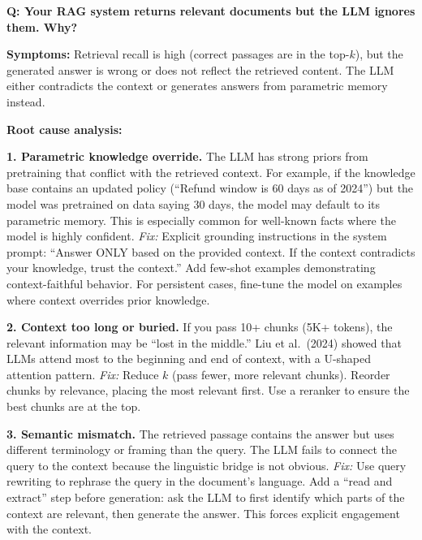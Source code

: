 
\begin{interviewq}
\textbf{Q: Your RAG system returns relevant documents but the LLM ignores them. Why?}

 \quad {} \quad \badgefreq{\freqhigh}

\stronganswer

\textbf{Symptoms:} Retrieval recall is high (correct passages are in the top-$k$), but the generated answer is wrong or does not reflect the retrieved content. The LLM either contradicts the context or generates answers from parametric memory instead.

\textbf{Root cause analysis:}

\textbf{1. Parametric knowledge override.} The LLM has strong priors from pretraining that conflict with the retrieved context. For example, if the knowledge base contains an updated policy (``Refund window is 60 days as of 2024'') but the model was pretrained on data saying 30 days, the model may default to its parametric memory. This is especially common for well-known facts where the model is highly confident.
\textit{Fix:} Explicit grounding instructions in the system prompt: ``Answer ONLY based on the provided context. If the context contradicts your knowledge, trust the context.'' Add few-shot examples demonstrating context-faithful behavior. For persistent cases, fine-tune the model on examples where context overrides prior knowledge.

\textbf{2. Context too long or buried.} If you pass 10+ chunks (5K+ tokens), the relevant information may be ``lost in the middle.'' Liu et al.\ (2024) showed that LLMs attend most to the beginning and end of context, with a U-shaped attention pattern.
\textit{Fix:} Reduce $k$ (pass fewer, more relevant chunks). Reorder chunks by relevance, placing the most relevant first. Use a reranker to ensure the best chunks are at the top.

\textbf{3. Semantic mismatch.} The retrieved passage contains the answer but uses different terminology or framing than the query. The LLM fails to connect the query to the context because the linguistic bridge is not obvious.
\textit{Fix:} Use query rewriting to rephrase the query in the document's language. Add a ``read and extract'' step before generation: ask the LLM to first identify which parts of the context are relevant, then generate the answer. This forces explicit engagement with the context.


\end{interviewq}
